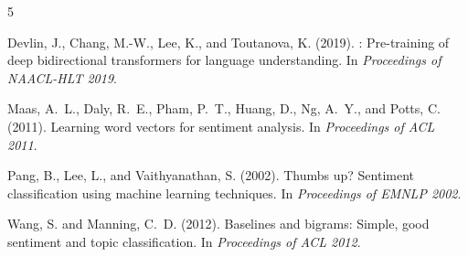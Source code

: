 \documentclass[11pt]{article}
\begin{document}
\begin{thebibliography}{5}

Devlin, J., Chang, M.-W., Lee, K., and Toutanova, K. (2019).
: Pre-training of deep bidirectional transformers for language understanding.
\newblock In \emph{Proceedings of NAACL-HLT 2019}.

Maas, A.~L., Daly, R.~E., Pham, P.~T., Huang, D., Ng, A.~Y., and Potts, C. (2011).
\newblock Learning word vectors for sentiment analysis.
\newblock In \emph{Proceedings of ACL 2011}.

Pang, B., Lee, L., and Vaithyanathan, S. (2002).
\newblock Thumbs up? {S}entiment classification using machine learning techniques.
\newblock In \emph{Proceedings of EMNLP 2002}.

Wang, S. and Manning, C.~D. (2012).
\newblock Baselines and bigrams: Simple, good sentiment and topic classification.
\newblock In \emph{Proceedings of ACL 2012}.

\end{thebibliography}
\end{document}
